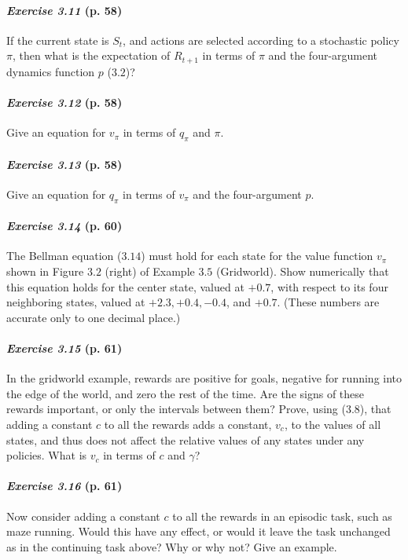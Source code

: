 \documentclass[10pt,a4paper]{article}
\begin{document}
\paragraph{\textit{Exercise 3.11} (p. 58)} If the current state is $S_t$, and actions are selected according to a stochastic
policy $\pi$, then what is the expectation of $R_{t+1}$ in terms of $\pi$ and the four-argument dynamics function $p$ ($3.2$)?

\paragraph{\textit{Exercise 3.12} (p. 58)} Give an equation for $v_\pi$ in terms of $q_\pi$ and $\pi$.

\paragraph{\textit{Exercise 3.13} (p. 58)} Give an equation for $q_\pi$ in terms of $v_\pi$ and the four-argument $p$.

\paragraph{\textit{Exercise 3.14} (p. 60)} The Bellman equation ($3.14$) must hold for each state for the value function $v_\pi$ shown in Figure $3.2$ (right) of Example $3.5$ (Gridworld). Show numerically that this equation holds for the center state, valued at $+0.7$, with respect to its four neighboring states, valued at
$+2.3, +0.4, -0.4$, and $+0.7$. (These numbers are accurate only to one decimal place.)

\paragraph{\textit{Exercise 3.15} (p. 61)} In the gridworld example, rewards are positive for goals, negative for running into the edge of the world, and zero the rest of the time. Are the signs of these rewards important, or only the intervals between them? Prove, using ($3.8$), that adding a
constant $c$ to all the rewards adds a constant, $v_c$, to the values of all states, and thus does not affect the relative values of any states under any policies. What is $v_c$ in terms of $c$ and $\gamma$?

\paragraph{\textit{Exercise 3.16} (p. 61)} Now consider adding a constant $c$ to all the rewards in an episodic task, such as maze running. Would this have any effect, or would it leave the task unchanged as in the continuing task above? Why or why not? Give an example.
\end{document}
